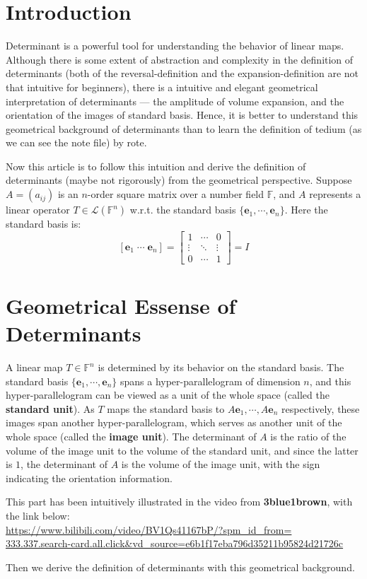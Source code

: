 \documentclass{article}
\begin{document}
\section{Introduction}
Determinant is a powerful tool for understanding the behavior of linear maps. Although there is some extent of abstraction and complexity in the definition of determinants (both of the reversal-definition and the expansion-definition are not that intuitive for beginners), there is a intuitive and elegant geometrical interpretation of determinants — the amplitude of volume expansion, and the orientation of the images of standard basis. Hence, it is better to understand this geometrical background of determinants than to learn the definition of tedium (as we can see the note file) by rote. \par
Now this article is to follow this intuition and derive the definition of determinants (maybe not rigorously) from the geometrical perspective. Suppose $A = (a_{ij})$ is an $n$-order square matrix over a number field $\mathbb{F}$, and $A$ represents a linear operator $T\in\mathcal{L}(\mathbb{F}^n)$ w.r.t. the standard basis $ \{\pmb{e}_1, \cdots, \pmb{e}_n\} $. Here the standard basis is:
$$ [\pmb{e}_1\; \cdots \;\pmb{e}_n] = \begin{bmatrix}
    1 & \cdots & 0 \\
    \vdots & \ddots & \vdots \\
    0 & \cdots & 1 
\end{bmatrix} = I $$

\section{Geometrical Essense of Determinants}
A linear map $T\in\mathbb{F}^n$ is determined by its behavior on the standard basis. The standard basis $\{\pmb{e}_1, \cdots, \pmb{e}_n\}$ spans a hyper-parallelogram of dimension $n$, and this hyper-parallelogram can be viewed as a unit of the whole space (called the \textbf{standard unit}). As $T$ maps the standard basis to $A\pmb{e}_1, \cdots, A\pmb{e}_n$ respectively, these images span another hyper-parallelogram, which serves as another unit of the whole space (called the \textbf{image unit}). The determinant of $A$ is the ratio of the volume of the image unit to the volume of the standard unit, and since the latter is $1$, the determinant of $A$ is the volume of the image unit, with the sign indicating the orientation information. 

This part has been intuitively illustrated in the video from \textbf{3blue1brown}, with the link below: \\
\href{https://www.bilibili.com/video/BV1Qs41167bP/?spm\_id\_from=333.337.search-card.all.click\&vd\_source=e6b1f17eba796d35211b95824d21726c}{https://www.bilibili.com/video/BV1Qs41167bP/?spm\_id\_from=\\ 333.337.search-card.all.click\&vd\_source=e6b1f17eba796d35211b95824d21726c} \par
Then we derive the definition of determinants with this geometrical background.
\end{document}

